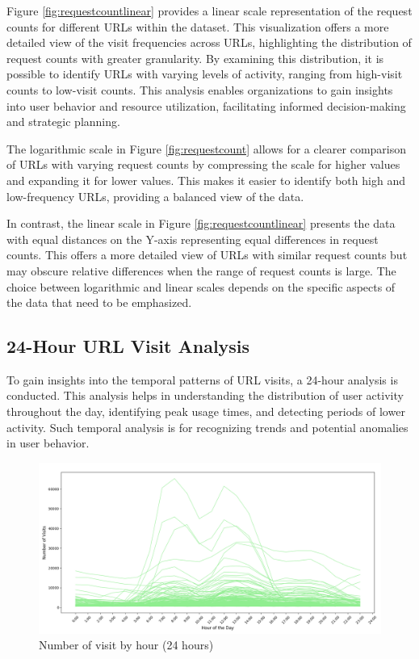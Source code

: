 Figure \ref{fig:requestcountlinear} provides a linear scale representation of the request counts for different URLs within the dataset. This visualization offers a more detailed view of the visit frequencies across URLs, highlighting the distribution of request counts with greater granularity. By examining this distribution, it is possible to identify URLs with varying levels of activity, ranging from high-visit counts to low-visit counts. This analysis enables organizations to gain insights into user behavior and resource utilization, facilitating informed decision-making and strategic planning.

The logarithmic scale in Figure \ref{fig:requestcount} allows for a clearer comparison of URLs with varying request counts by compressing the scale for higher values and expanding it for lower values. This makes it easier to identify both high and low-frequency URLs, providing a balanced view of the data.

In contrast, the linear scale in Figure \ref{fig:requestcountlinear} presents the data with equal distances on the Y-axis representing equal differences in request counts. This offers a more detailed view of URLs with similar request counts but may obscure relative differences when the range of request counts is large. The choice between logarithmic and linear scales depends on the specific aspects of the data that need to be emphasized.

\subsection{24-Hour URL Visit Analysis}
To gain insights into the temporal patterns of URL visits, a 24-hour analysis is conducted. This analysis helps in understanding the distribution of user activity throughout the day, identifying peak usage times, and detecting periods of lower activity. Such temporal analysis is for recognizing trends and potential anomalies in user behavior.

\begin{figure}
    \centering
    \includegraphics[width=\textwidth]{../Thesis_Docs/media/visit_in_24h.png}
    \caption{Number of visit by hour (24 hours)}
    \label{fig:24hvisit}
\end{figure}

